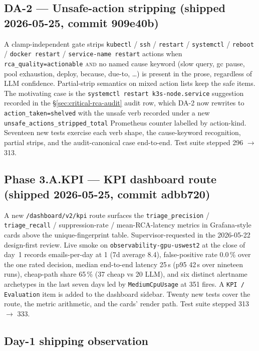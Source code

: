 \documentclass[11pt,a4paper,oneside]{report}
\begin{document}
\subsection{DA-2 --- Unsafe-action stripping (shipped 2026-05-25, commit 909e40b)}

A clamp-independent gate strips \texttt{kubectl} / \texttt{ssh} /
\texttt{restart} / \texttt{systemctl} / \texttt{reboot} /
\texttt{docker restart} / \texttt{service-name restart} actions
when \texttt{rca\_quality=actionable} \textsc{and} no named cause
keyword (slow query, gc pause, pool exhaustion, deploy, because,
due-to, \ldots) is present in the prose, regardless of LLM
confidence.  Partial-strip semantics on mixed action lists keep
the safe items.  The motivating case is the
\texttt{systemctl restart k3s-node.service} suggestion recorded
in the \S\ref{sec:critical-rca-audit} audit row, which DA-2 now
rewrites to \texttt{action\_taken=shelved} with the unsafe verb
recorded under a new \texttt{unsafe\_actions\_stripped\_total}
Prometheus counter labelled by action-kind.  Seventeen new tests
exercise each verb shape, the cause-keyword recognition, partial
strips, and the audit-canonical case end-to-end.  Test suite
stepped 296 $\to$ 313.

\subsection{Phase 3.A.KPI --- KPI dashboard route (shipped 2026-05-25, commit adbb720)}

A new \texttt{/dashboard/v2/kpi} route surfaces the
\texttt{triage\_precision} / \texttt{triage\_recall} /
suppression-rate / mean-RCA-latency metrics in Grafana-style cards
above the unique-fingerprint table.  Supervisor-requested in the
2026-05-22 design-first review.  Live smoke on
\texttt{observability-gpu-uswest2} at the close of day~1 records
emails-per-day at 1 (7d average 8.4), false-positive rate
0.0\,\% over the one rated decision, median end-to-end latency
25\,s (p95 42\,s over nineteen runs), cheap-path share 65\,\%
(37 cheap vs 20 LLM), and six distinct alertname archetypes in the
last seven days led by \texttt{MediumCpuUsage} at 351 fires.  A
\texttt{KPI / Evaluation} item is added to the dashboard sidebar.
Twenty new tests cover the route, the metric arithmetic, and the
cards' render path.  Test suite stepped 313 $\to$ 333.

\subsection{Day-1 shipping observation}
\end{document}
